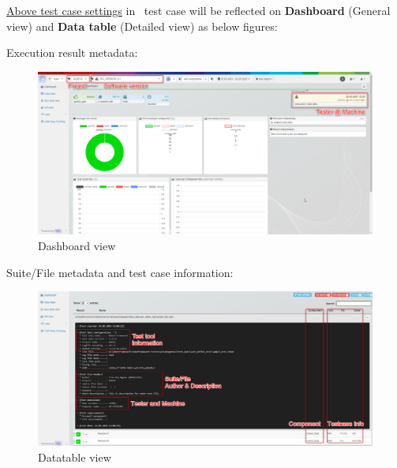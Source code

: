 \hyperref[description-robotframework-testcase-settings]{Above test case settings} 
in \rfwcore\ test case will be reflected on \textbf{Dashboard} (General view) 
and \textbf{Data table} (Detailed view) as below figures:

Execution result metadata:

\begin{figure}[h!]
  \includegraphics[width=1\linewidth]{./pictures/Dashboard.png}
  \caption{Dashboard view}
\end{figure}

Suite/File metadata and test case information:

\begin{figure}[h!]
  \includegraphics[width=1\linewidth]{./pictures/Datatable.png}
  \caption{Datatable view}
\end{figure}